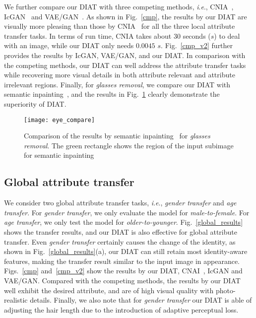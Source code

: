 \documentclass[journal]{IEEEtran}
\newcommand{\ie}{\textit{i}.\textit{e}.}
\begin{document}
We further compare our DIAT with three competing methods, \ie, CNIA~\cite{li2016convolutional}, IcGAN~\cite{Perarnau2016} and VAE/GAN~\cite{larsen2015autoencoding}.
As shown in Fig.~\ref{cmp}, the results by our DIAT are visually more pleasing than those by CNIA~\cite{li2016convolutional} for all the three local attribute transfer tasks.
In terms of run time, CNIA takes about $30$ seconds ($s$) to deal with an image, while our DIAT only needs $0.0045$ $s$.
Fig.~\ref{cmp_v2} further provides the results by IcGAN, VAE/GAN, and our DIAT.
In comparison with the competing methods, our DIAT can well address the attribute transfer tasks while recovering more visual details in both attribute relevant and attribute irrelevant regions.
Finally, for \emph{glasses removal}, we compare our DIAT with semantic inpainting~\cite{yeh2016semantic}, and the results in Fig.~\ref{inpainting} clearly demonstrate the superiority of DIAT.
\begin{figure}[t]
\begin{center}
   \texttt{[image: eye\_compare]}
\end{center}
   \caption{Comparison of the results by semantic inpainting~\cite{yeh2016semantic} for \emph{glasses removal}. The green rectangle shows the region of the input subimage for semantic inpainting}
\label{inpainting}
\end{figure}




\subsection{Global attribute transfer}

We consider two global attribute transfer tasks, \ie, \emph{gender transfer} and \emph{age transfer}.
For \emph{gender transfer}, we only evaluate the model for \emph{male-to-female}.
For \emph{age transfer}, we only test the model for \emph{older-to-younger}.
Fig.~\ref{global_results} shows the transfer results, and our DIAT is also effective for global attribute transfer.
Even \emph{gender transfer} certainly causes the change of the identity, as shown in Fig.~\ref{global_results}(a), our DIAT can still retain most identity-aware features, making the transfer result similar to the input image in appearance.
Figs.~\ref{cmp} and~\ref{cmp_v2} show the results by our DIAT, CNAI~\cite{li2016convolutional}, IcGAN and VAE/GAN.
Compared with the competing methods, the results by our DIAT well exhibit the desired attribute, and are of high visual quality with photo-realistic details.
Finally, we also note that for \emph{gender transfer} our DIAT is able of adjusting the hair length due to the introduction of adaptive perceptual loss.
\end{document}
